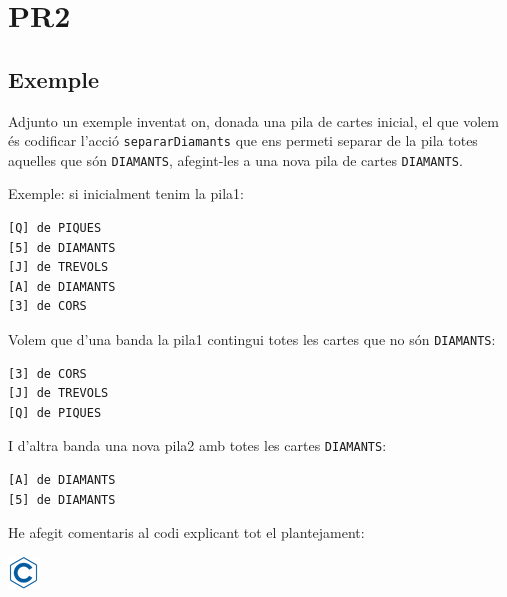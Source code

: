 \documentclass[]{book}
\begin{document}
\chapter{PR2}\label{pr2}

\section{Exemple}\label{exemple-2}

Adjunto un exemple inventat on, donada una pila de cartes inicial, el
que volem és codificar l'acció \texttt{separarDiamants} que ens permeti
separar de la pila totes aquelles que són \texttt{DIAMANTS}, afegint-les
a una nova pila de cartes \texttt{DIAMANTS}.

Exemple: si inicialment tenim la pila1:

\begin{verbatim}
[Q] de PIQUES
[5] de DIAMANTS
[J] de TREVOLS
[A] de DIAMANTS
[3] de CORS
\end{verbatim}

Volem que d'una banda la pila1 contingui totes les cartes que no són
\texttt{DIAMANTS}:

\begin{verbatim}
[3] de CORS
[J] de TREVOLS
[Q] de PIQUES
\end{verbatim}

I d'altra banda una nova pila2 amb totes les cartes \texttt{DIAMANTS}:

\begin{verbatim}
[A] de DIAMANTS
[5] de DIAMANTS
\end{verbatim}

He afegit comentaris al codi explicant tot el plantejament:

\includegraphics{./img/c.png}
\end{document}
